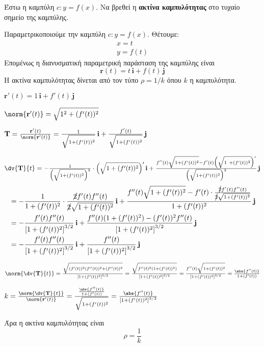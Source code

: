 \documentclass[a4paper,table]{report}
\begin{document}
\begin{mybox3}
  \begin{thema}
    Έστω η καμπύλη $ c: y=f(x) $. Να βρεθεί η \textbf{ακτίνα καμπυλότητας} στο τυχαίο 
    σημείο της καμπύλης.
  \end{thema}
\end{mybox3}
\begin{solution}
  Παραμετρικοποιούμε την καμπύλη $ c: y=f(x) $. Θέτουμε:
  \begin{gather*}
    x=t \\
    y= f(t)
  \end{gather*} 
  Επομένως η διανυσματική παραμετρική παράσταση της καμπύλης είναι
  \[
    \mathbf{r}(t)=t\, \mathbf{i} + f(t)\, \mathbf{j} 
  \]
  Η ακτίνα καμπυλότητας δίνεται από τον τύπο $ \rho = 1/k $ όπου $k$ η καμπυλότητα. 
  \begin{myitemize}
    \item $ \mathbf{r'}(t)=1\, \mathbf{i} + f'(t)\, \mathbf{j} $
    \item $ \norm{\mathbf{r'}(t)} = \sqrt{\strut 1^{2}+ (f'(t))^{2}} $ 
    \item $ \mathbf{T} = \frac{\mathbf{r'}(t)}{\norm{\mathbf{r'}(t)}} =
      \frac{1}{\sqrt{\strut 1 + (f'(t))^{2}}}\,\mathbf{i} + \frac{f'(t)}{\sqrt{\strut 1 + (f'(t))^{2}}}\,\mathbf{j} $
    \item $ \dv{\mathbf{T}}{t} =  - \frac{1}{\Bigl(\sqrt{\strut1 + (f'(t))^{2}}\Bigr)^{2}}\cdot\Bigl(\sqrt{\strut 1 + (f'(t))^{2}}\Bigr)'\,\mathbf{i} + \frac{f''(t)
        \sqrt{\strut 1 + (f'(t))^{2}} - f'(t) \Bigl(\sqrt{\strut 1\ +
      (f'(t))^{2}}\Bigr)'}{\Bigl(\sqrt{\strut 1 + (f'(t))^{2}}\Bigr)^{2}} \,\mathbf{j} $
      \begin{align*}
    &=  - \frac{1}{1 + (f'(t))^{2}}
    \cdot\frac{\cancel{2} f'(t)f''(t)}{\cancel{2} \sqrt{ 1 + (f'(t))^{2}}}\,\mathbf{i} + \frac{f''(t)
      \sqrt{\strut 1
    + (f'(t))^{2}} - f'(t) \cdot\frac{\cancel{2} f'(t)f''(t)}{\cancel{2} \sqrt{1 + (f'(t))^{2}}}}{1 +
  (f'(t))^{2}} \,\mathbf{j} \\
    &= - \frac{f'(t)f''(t)}{\left[1+ (f'(t))^{2}\right]^{3/2}}\,\mathbf{i}
    + \frac{f''(t)(1+(f'(t))^{2})- (f'(t))^{2}f''(t)}{\left[1+(f'(t))^{2}\right]^{3/2}}
    \,\mathbf{j} \\
    &= - \frac{f'(t)f''(t)}{\left[1+ (f'(t))^{2}\right]^{3/2}}\,\mathbf{i}
    + \frac{f''(t)}{\left[1+(f'(t))^{2}\right]^{3/2}} \,\mathbf{j} 
      \end{align*}
    \item $ \norm{\dv{\mathbf{T}}{t}} = \frac{\sqrt{\strut(f'(t))^{2}(f''(t))^{2} +
      (f''(t))^{2}}}{\left[1+(f'(t))^{2}\right]^{3/2}} = 
      \frac{\sqrt{\strut f''(t)^{2}(1+(f'(t))^{2})}}{\left[1+(f'(t))^{2}\right]^{3/2}} =
      \frac{f''(t) \sqrt{\strut1+ (f'(t))^{2}}}{\left[1+(f'(t))^{2}\right]^{3/2}} =
      \frac{\abs{f''(t)}}{1+(f'(t))}$ 
    \item $ k = \frac{\norm{\dv{\mathbf{T}}{t}}}{\norm{\mathbf{r'}(t) }} = 
      \frac{\frac{\abs{f''(t)}}{1+(f'(t))}}{\sqrt{\strut 1+(f'(t))^{2}}} =
      \frac{\abs{f''(t)}}{\left[1+(f'(t))^{2}\right]^{3/2}} $  
  \end{myitemize}
  Άρα η ακτίνα καμπυλότητας είναι
  \[
    \rho = \frac{1}{k} 
  \]
\end{solution}
\end{document}
